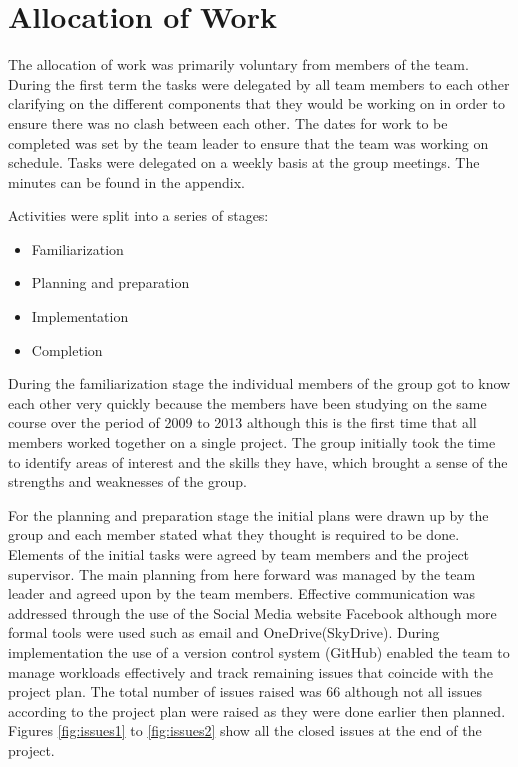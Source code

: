 \section{Allocation of Work}
\label{sec:allocation_of_work}

The allocation of work was primarily voluntary from members of the team. During the first term the tasks were delegated by all team members to each other clarifying on the different components that they would be working on in order to ensure there was no clash between each other. The dates for work to be completed was set by the team leader to ensure that the team was working on schedule. Tasks were delegated on a weekly basis at the group meetings. The minutes can be found in the appendix. 

Activities were split into a series of stages:

\begin{itemize}
    \item Familiarization
    \item Planning and preparation
    \item Implementation
    \item Completion
\end{itemize}

During the familiarization stage the individual members of the group got to know each other very quickly because the members have been studying on the same course over the period of 2009 to 2013 although this is the first time that all members worked together on a single project. The group initially took the time to identify areas of interest and the skills they have, which brought a sense of the strengths and weaknesses of the group.

For the planning and preparation stage the initial plans were drawn up by the group and each member stated what they thought is required to be done. Elements of the initial tasks were agreed by team members and the project supervisor. The main planning from here forward was managed by the team leader and agreed upon by the team members. Effective communication was addressed through the use of the Social Media website Facebook although more formal tools were used such as email and OneDrive(SkyDrive). During implementation the use of a version control system (GitHub) enabled the team to manage workloads effectively and track remaining issues that coincide with the project plan. The total number of issues raised was 66 although not all issues according to the project plan were raised as they were done earlier then planned. Figures \ref{fig:issues1} to \ref{fig:issues2} show all the closed issues at the end of the project.

